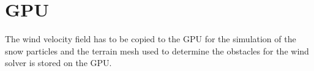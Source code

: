 \section{GPU}

The wind velocity field has to be copied to the GPU for the simulation of the snow 
particles and the terrain mesh used to determine the obstacles for the wind solver 
is stored on the GPU. 
